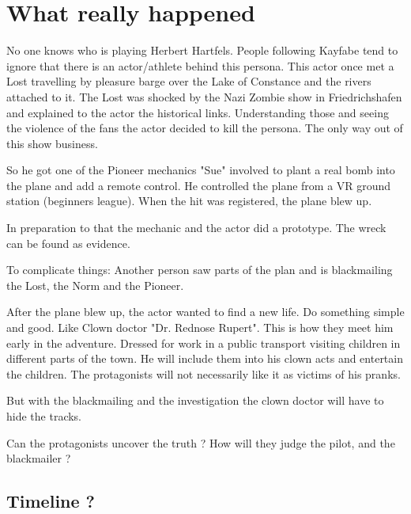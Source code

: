 \section{What really happened}

No one knows who is playing Herbert Hartfels. People following Kayfabe tend to ignore that there is an actor/athlete behind this persona.
This actor once met a Lost travelling by pleasure barge over the Lake of Constance and the rivers attached to it.
The Lost was shocked by the Nazi Zombie show in Friedrichshafen and explained to the actor the historical links.
Understanding those and seeing the violence of the fans the actor decided to kill the persona. The only way out of this show business.

So he got one of the Pioneer mechanics "Sue" involved to plant a real bomb into the plane and add a remote control. He controlled the plane from a VR ground station (beginners league).
When the hit was registered, the plane blew up.

In preparation to that the mechanic and the actor did a prototype. The wreck can be found as evidence.

To complicate things: Another person saw parts of the plan and is blackmailing the Lost, the Norm and the Pioneer.

After the plane blew up, the actor wanted to find a new life. Do something simple and good. Like Clown doctor "Dr. Rednose Rupert". This is how they meet him early in the adventure. Dressed for work in a public transport visiting children in different parts of the town. He will include them into his clown acts and entertain the children. The protagonists will not necessarily like it as victims of his pranks.

But with the blackmailing and the investigation the clown doctor will have to hide the tracks.

Can the protagonists uncover the truth ? How will they judge the pilot, and the blackmailer ?

\subsection{Timeline ?}

